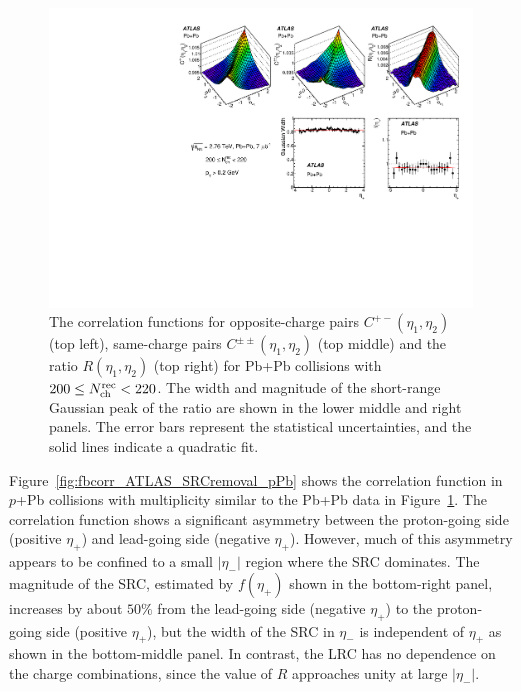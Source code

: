 \begin{figure}[H]
\centering
\includegraphics[width=.95\linewidth]{figs/chapter_fbcorr/ATLAS_SRCremoval_PbPb.pdf}
\caption{The correlation functions for opposite-charge pairs $C^{+-}(\eta_1, \eta_2)$ (top left), same-charge pairs $C^{\pm\pm}(\eta_1, \eta_2)$ (top middle) and the ratio $R(\eta_1, \eta_2)$ (top right) for Pb+Pb collisions with $200 \le N_\text{ch}^\text{rec} < 220$. The width and magnitude of the short-range Gaussian peak of the ratio are shown in the lower middle and right panels. The error bars represent the statistical uncertainties, and the solid lines indicate a quadratic fit.}
\label{fig:fbcorr_ATLAS_SRCremoval_PbPb}
\end{figure}

Figure~\ref{fig:fbcorr_ATLAS_SRCremoval_pPb} shows the correlation function in $p$+Pb collisions with multiplicity similar to the Pb+Pb data in Figure~\ref{fig:fbcorr_ATLAS_SRCremoval_PbPb}. The correlation function shows a significant asymmetry between the proton-going side (positive $\eta_+$) and lead-going side (negative $\eta_+$). However, much of this asymmetry appears to be confined to a small $|\eta_-|$ region where the SRC dominates. The magnitude of the SRC, estimated by $f(\eta_+)$ shown in the bottom-right panel, increases by about $50\%$ from the lead-going side (negative $\eta_+$) to the proton-going side (positive $\eta_+$), but the width of the SRC in $\eta_-$ is independent of $\eta_+$ as shown in the bottom-middle panel. In contrast, the LRC has no dependence on the charge combinations, since the value of $R$ approaches unity at large $|\eta_-|$.

